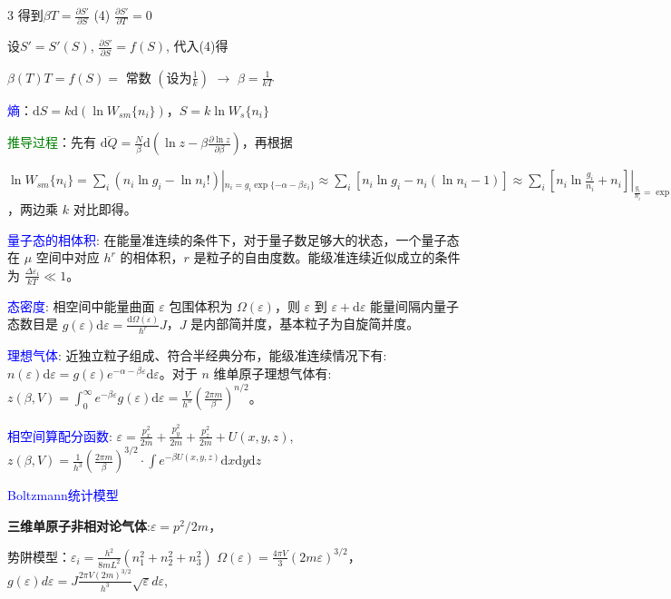 \documentclass[a4paper,8pt]{extarticle} %
\newcommand{\bluetext}[1]{\textcolor{blue}{#1}}
\newcommand{\greentext}[1]{\textcolor{green}{#1}}
\begin{document}
\begin{multicols}{3}
得到$\beta T = \frac{\partial S'}{\partial S}$ (4)
$\frac{\partial S'}{\partial T} = 0$

设$S' = S'(S)$, $\frac{\partial S'}{\partial S} = f(S)$, 代入(4)得

$\beta(T)T = f(S) =$ 常数 $(设为\frac{1}{k})$ $\rightarrow$ $\beta = \frac{1}{kT}$

\bluetext{熵}：$\mathrm{d}S = k\mathrm{d}(\ln W_{sm}\{n_i\})$，$S = k\ln W_s\{n_i\}$

\greentext{推导过程}：先有 $\overline{\mathrm{d}Q} = \frac{N}{\beta}\mathrm{d}(\ln z - \beta\frac{\partial\ln z}{\partial\beta})$，再根据 

$\ln W_{sm}\{n_i\} = \sum_i (n_i\ln g_i - \ln n_i!)|_{n_i=g_i\exp\{-\alpha-\beta\varepsilon_i\}} \approx \sum_i [n_i\ln g_i - n_i(\ln n_i-1)] \approx \sum_i [n_i\ln \frac{g_i}{n_i} + n_i]|_{\frac{g_i}{n_i}=\exp\{\alpha+\beta\varepsilon_i\}} = \sum_i n_i(\alpha + \beta\varepsilon_i + 1) = N\alpha + \beta E + N = N(\ln z - \beta\frac{\partial\ln z}{\partial\beta}) + N(1-\ln N)$，两边乘 $k$ 对比即得。

\bluetext{量子态的相体积}: 在能量准连续的条件下，对于量子数足够大的状态，一个量子态在 $\mu$ 空间中对应 $h^r$ 的相体积，$r$ 是粒子的自由度数。能级准连续近似成立的条件为 $\frac{\Delta \varepsilon_i}{kT} \ll 1$。

\bluetext{态密度}: 相空间中能量曲面 $\varepsilon$ 包围体积为 $\Omega(\varepsilon)$，则 $\varepsilon$ 到 $\varepsilon + \mathrm{d}\varepsilon$ 能量间隔内量子态数目是 $g(\varepsilon)\mathrm{d}\varepsilon = \frac{\mathrm{d}\Omega(\varepsilon)}{h^r}J$，$J$ 是内部简并度，基本粒子为自旋简并度。

\bluetext{理想气体}: 近独立粒子组成、符合半经典分布，能级准连续情况下有: $n(\varepsilon)\mathrm{d}\varepsilon = g(\varepsilon)e^{-\alpha-\beta\varepsilon}\mathrm{d}\varepsilon$。对于 $n$ 维单原子理想气体有: $z(\beta,V) = \int_0^{\infty}e^{-\beta\varepsilon}g(\varepsilon)\mathrm{d}\varepsilon = \frac{V}{h^n}\left(\frac{2\pi m}{\beta}\right)^{n/2}$。

\bluetext{相空间算配分函数}: $\varepsilon = \frac{p_x^2}{2m} + \frac{p_y^2}{2m} + \frac{p_z^2}{2m} + U(x,y,z)$, $z(\beta,V) = \frac{1}{h^3}\left(\frac{2\pi m}{\beta}\right)^{3/2}\cdot\int e^{-\beta U(x,y,z)}\mathrm{d}x\mathrm{d}y\mathrm{d}z$

\bluetext{Boltzmann统计模型}

\textbf{三维单原子非相对论气体}:$\varepsilon = p^2/2m$，

势阱模型：$\varepsilon_i = \frac{h^2}{8mL^2}(n_1^2+n_2^2+n_3^2)$
$\Omega(\varepsilon) = \frac{4\pi V}{3}(2m\varepsilon)^{3/2}$，$g(\varepsilon)d\varepsilon = J\frac{2\pi V(2m)^{3/2}}{h^3}\sqrt{\varepsilon}d\varepsilon$,


\end{multicols}
\end{document}
